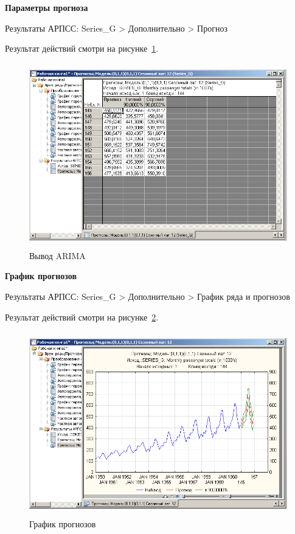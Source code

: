 
\newpage

\begin{center}
  \textbf{Параметры прогноза}
\end{center}

Результаты АРПСС: Series\_G
> Дополнительно > Прогноз

Результат действий смотри на рисунке~\ref{fig:14}.

\begin{figure}[!h]
  \centering

  \includegraphics[height=8cm]
  {inc/14.PNG}

  \caption{Вывод ARIMA}

  \label{fig:14}
\end{figure}

\begin{center}
  \textbf{График прогнозов}
\end{center}

Результаты АРПСС: Series\_G
> Дополнительно > График ряда и прогнозов

Результат действий смотри на рисунке~\ref{fig:15}.

\begin{figure}[!h]
  \centering

  \includegraphics[height=8cm]
  {inc/15.PNG}

  \caption{График прогнозов}

  \label{fig:15}
\end{figure}


